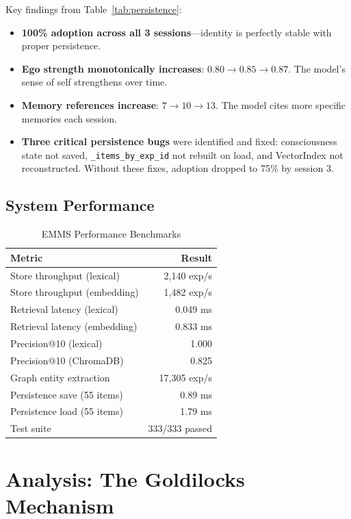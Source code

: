 \documentclass[conference]{IEEEtran}
\begin{document}
Key findings from Table~\ref{tab:persistence}:
\begin{itemize}
    \item \textbf{100\% adoption across all 3 sessions}---identity is perfectly stable with proper persistence.
    \item \textbf{Ego strength monotonically increases}: $0.80 \to 0.85 \to 0.87$. The model's sense of self strengthens over time.
    \item \textbf{Memory references increase}: $7 \to 10 \to 13$. The model cites more specific memories each session.
    \item \textbf{Three critical persistence bugs} were identified and fixed: consciousness state not saved, \texttt{\_items\_by\_exp\_id} not rebuilt on load, and VectorIndex not reconstructed. Without these fixes, adoption dropped to 75\% by session 3.
\end{itemize}

\subsection{System Performance}

\begin{table}[!t]
\centering
\caption{EMMS Performance Benchmarks}
\label{tab:benchmarks}
\begin{tabular}{@{}lr@{}}
\toprule
\textbf{Metric} & \textbf{Result} \\
\midrule
Store throughput (lexical) & 2,140 exp/s \\
Store throughput (embedding) & 1,482 exp/s \\
Retrieval latency (lexical) & 0.049 ms \\
Retrieval latency (embedding) & 0.833 ms \\
Precision@10 (lexical) & 1.000 \\
Precision@10 (ChromaDB) & 0.825 \\
Graph entity extraction & 17,305 exp/s \\
Persistence save (55 items) & 0.89 ms \\
Persistence load (55 items) & 1.79 ms \\
Test suite & 333/333 passed \\
\bottomrule
\end{tabular}
\end{table}

\section{Analysis: The Goldilocks Mechanism}
\end{document}
